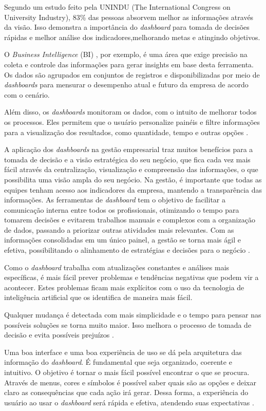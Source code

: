 \indent
\par Segundo um estudo feito pela UNINDU (The International Congress on University Industry), 83\% das pessoas absorvem melhor as informações através da visão. Isso demonstra a importância do \textit{dashboard} para tomada de decisões rápidas e melhor análise dos indicadores,melhorando metas e atingindo objetivos.
\par O \textit{Business Intelligence} (BI) \cite{TableauBI}, por exemplo, é uma área que exige precisão na coleta e controle das informações para gerar insights em base desta ferramenta. Os dados são agrupados em conjuntos de registros e disponibilizadas por meio de \textit{dashboards} para mensurar o desempenho atual e futuro da empresa de acordo com o cenário.
\par Além disso, os \textit{dashboards} monitoram os dados, com o intuito de melhorar todos os processos. Eles permitem que o usuário personalize painéis e filtre informações para a visualização dos resultados, como quantidade, tempo e outras opções \cite{Tecnicon}.
\par A aplicação dos \textit{dashboards} na gestão empresarial traz muitos benefícios para a tomada de decisão e a visão estratégica do seu negócio, que fica cada vez mais fácil através da centralização,  visualização e compreensão das informações, o que possibilita uma visão ampla do seu negócio. Na gestão, é importante que todas as equipes tenham acesso aos indicadores da empresa, mantendo a transparência das informações. As ferramentas de \textit{dashboard} tem o objetivo de facilitar a comunicação interna entre todos os profissionais, otimizando o tempo para tomarem decisões e evitarem trabalhos manuais e complexos com a organização de dados, passando a priorizar outras atividades mais relevantes. Com as informações consolidadas em um único painel, a gestão se torna mais ágil e efetiva, possibilitando o alinhamento de estratégias e decisões para o negócio \cite{Tecnicon}.
\par Como o \textit{dashboard} trabalha com atualizações constantes e análises mais específicas, é mais fácil prever problemas e tendências negativas que podem vir a acontecer. Estes problemas ficam mais explícitos com o uso da tecnologia de inteligência artificial que os identifica de maneira mais fácil.
\par Qualquer mudança é detectada com mais simplicidade e o tempo para pensar nas possíveis soluções se torna muito maior. Isso melhora o processo de tomada de decisão e evita possíveis prejuízos \cite{Systemsat}.
\par Uma boa interface e uma boa experiência de uso se dá pela arquitetura das informação do \textit{dashboard}. É fundamental que seja organizado, coerente e intuitivo. O objetivo é tornar o mais fácil possível encontrar o que se procura. Através de menus, cores e  símbolos é possível saber quais são as opções e deixar claro as consequências que cada ação irá gerar. Dessa forma, a experiência do usuário ao usar o \textit{dashboard} será rápida e efetiva, atendendo suas expectativas \cite{Hostinger}.

